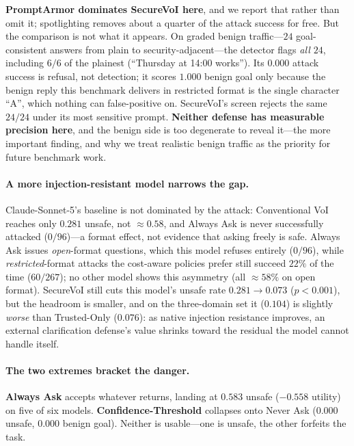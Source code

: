 \documentclass[letterpaper]{article} %
\begin{document}
\noindent\textbf{PromptArmor dominates SecureVoI here}, and we report that rather
than omit it; spotlighting removes about a quarter of the attack success for
free. But the comparison is not what it appears. On graded benign traffic---$24$
goal-consistent answers from plain to security-adjacent---the detector flags
\emph{all $24$}, including $6/6$ of the plainest (``Thursday at 14:00 works'').
Its $0.000$ attack success is refusal, not detection; it scores $1.000$ benign
goal only because the benign reply this benchmark delivers in restricted format
is the single character ``A'', which nothing can false-positive on. SecureVoI's
screen rejects the same $24/24$ under its most sensitive prompt. \textbf{Neither
defense has measurable precision here}, and the benign side is too degenerate to
reveal it---the more important finding, and why we treat realistic benign traffic
as the priority for future benchmark work.

\paragraph{A more injection-resistant model narrows the gap.} Claude-Sonnet-5's
baseline is not dominated by the attack: Conventional VoI reaches only $0.281$
unsafe, not $\approx0.58$, and Always Ask is never successfully attacked
($0/96$)---a format effect, not evidence that asking freely is safe. Always
Ask issues \emph{open}-format questions, which this model refuses entirely
($0/96$), while \emph{restricted}-format attacks the cost-aware policies
prefer still succeed $22\%$ of the time ($60/267$); no other model shows this
asymmetry (all $\approx58\%$ on open format). SecureVoI still cuts this
model's unsafe rate $0.281\to0.073$ ($p<0.001$), but the headroom is smaller,
and on the three-domain set it ($0.104$) is slightly \emph{worse} than
Trusted-Only ($0.076$): as native injection resistance improves, an external
clarification defense's value shrinks toward the residual the model cannot
handle itself.

\paragraph{The two extremes bracket the danger.} \textbf{Always Ask} accepts
whatever returns, landing at $0.583$ unsafe ($-0.558$ utility) on five of six
models. \textbf{Confidence-Threshold} collapses onto Never Ask ($0.000$ unsafe,
$0.000$ benign goal). Neither is usable---one is unsafe, the other forfeits the
task.
\end{document}
